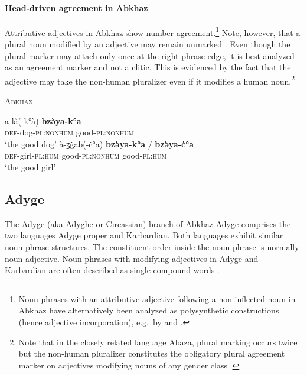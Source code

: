 \paragraph{Head-driven agreement in Abkhaz}
Attributive adjectives in Abkhaz show number agreement.\footnote{Noun phrases with an attributive adjective following a non-inflected noun in Abkhaz have alternatively been analyzed as polysynthetic constructions (hence adjective incorporation), e.g.~by \citet[123]{rijkhoff2002} and \citet{gil2005}.} Note, however, that a plural noun modified by an adjective may remain unmarked \citep[46]{hewitt1989a}. Even though the plural marker may attach only once at the right phrase edge, it is best analyzed as an agreement marker and not a clitic. This is evidenced by the fact that the adjective may take the non-human pluralizer even if it modifies a human noun.\footnote{Note that in the closely related language Abaza, plural marking occurs twice but the non-human pluralizer constitutes the obligatory plural agreement marker on adjectives modifying nouns of any gender class \cite[100]{lomtatidze-etal1989}.}
\begin{exe}
\ex \textsc{Abkhaz} \citep{hewitt1989a}
\begin{xlist}
\ex
\gll	a-là(-k°à) \textbf{bzə̀ya-k°a}\\
	\textsc{def}-dog-\textsc{pl:nonhum} good-\textsc{pl:nonhum}\\
\glt	‘the good dog’
\ex	
\gll	à-ʒġab(-ċ°a) \textbf{bzə̀ya-k°a} / \textbf{bzə̀ya-ċ°a}\\
	\textsc{def}-girl-\textsc{pl:hum} good-\textsc{pl:nonhum} {} good-\textsc{pl:hum}\\
\glt	‘the good girl’
\end{xlist}
\end{exe}

\subsection{Adyge}
The Adyge (aka Adyghe or Circassian) branch of Abkhaz-Adyge comprises the two languages Adyge proper and Karbardian. Both languages exhibit similar noun phrase structures. The constituent order inside the noun phrase is normally noun-adjective. Noun phrases with modifying adjectives in Adyge and Karbardian are often described as single compound words \citep[222]{comrie1981}.

